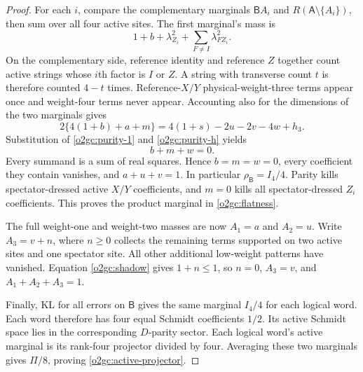 \documentclass[11pt]{article}
\theoremstyle{definition}
\begin{document}
\begin{proof}
For each \(i\), compare the complementary marginals
\(\mathsf B A_i\) and \(R(\mathsf A\setminus\{A_i\})\), then sum over
all four active sites. The first marginal's mass is
\[
 1+b+\lambda_{Z_i}^2+\sum_{F\ne I}\lambda_{FZ_i}^2.
\]
On the complementary side, reference identity and reference \(Z\)
together count active strings whose \(i\)th factor is \(I\) or \(Z\).
A string with transverse count \(t\) is therefore counted \(4-t\)
times. Reference-\(X/Y\) physical-weight-three terms appear once and
weight-four terms never appear. Accounting also for the dimensions of
the two marginals gives
\begin{equation}
 2\{4(1+b)+a+m\}
 =4(1+s)-2u-2v-4w+h_3.
 \label{o2gc:purity-2}
\end{equation}
Substitution of \eqref{o2gc:purity-1} and \eqref{o2gc:purity-h} yields
\begin{equation}
 b+m+w=0.
 \label{o2gc:purity-sos}
\end{equation}
Every summand is a sum of real squares. Hence \(b=m=w=0\), every
coefficient they contain vanishes, and \(a+u+v=1\). In particular
\(\rho_{\mathsf B}=I_4/4\). Parity kills spectator-dressed active
\(X/Y\) coefficients, and \(m=0\) kills all spectator-dressed \(Z_i\)
coefficients. This proves the product marginal in
\eqref{o2gc:flatness}.

The full weight-one and weight-two masses are now \(A_1=a\) and
\(A_2=u\). Write \(A_3=v+n\), where \(n\ge0\) collects the remaining
terms supported on two active sites and one spectator site. All other
additional low-weight patterns have vanished. Equation
\eqref{o2gc:shadow} gives \(1+n\le1\), so \(n=0\), \(A_3=v\), and
\(A_1+A_2+A_3=1\).

Finally, KL for all errors on \(\mathsf B\) gives the same marginal
\(I_4/4\) for each logical word. Each word therefore has four equal
Schmidt coefficients \(1/2\). Its active Schmidt space lies in the
corresponding \(D\)-parity sector. Each logical word's active marginal
is its rank-four projector divided by four. Averaging these two
marginals gives \(\Pi/8\), proving
\eqref{o2gc:active-projector}.
\end{proof}
\end{document}
